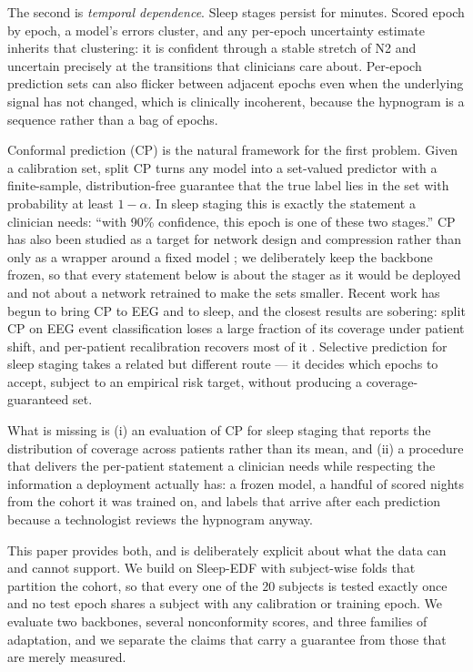 The second is \emph{temporal dependence}. Sleep stages persist for minutes.
Scored epoch by epoch, a model's errors cluster, and any per-epoch
uncertainty estimate inherits that clustering: it is confident through a
stable stretch of N2 and uncertain precisely at the transitions that
clinicians care about. Per-epoch prediction sets can also flicker between
adjacent epochs even when the underlying signal has not changed, which is
clinically incoherent, because the hypnogram is a sequence rather than a bag
of epochs.

Conformal prediction (CP) \citep{vovk2005,angelopoulos2023gentle} is the
natural framework for the first problem. Given a calibration set, split CP
turns any model into a set-valued predictor with a finite-sample,
distribution-free guarantee that the true label lies in the set with
probability at least $1-\alpha$. In sleep staging this is exactly the
statement a clinician needs: ``with 90\% confidence, this epoch is one of
these two stages.'' CP has also been studied as a target for network
design and compression rather than only as a wrapper around a fixed model
\citep{zhao2025pruning}; we deliberately keep the backbone frozen, so that
every statement below is about the stager as it would be deployed and not
about a network retrained to make the sets smaller. Recent work has begun to
bring CP to EEG and to
sleep, and the closest results are sobering: split CP on EEG event
classification loses a large fraction of its coverage under patient shift,
and per-patient recalibration recovers most of it \citep{chatterjee2026}. Selective
prediction for sleep staging \citep{cover2026} takes a related but different
route --- it decides which epochs to accept, subject to an empirical risk
target, without producing a coverage-guaranteed set.

What is missing is (i) an evaluation of CP for sleep staging that reports the
distribution of coverage across patients rather than its mean, and (ii) a
procedure that delivers the per-patient statement a clinician needs while
respecting the information a deployment actually has: a frozen model, a
handful of scored nights from the cohort it was trained on, and labels that
arrive after each prediction because a technologist reviews the hypnogram
anyway.

This paper provides both, and is deliberately explicit about what the data
can and cannot support. We build on Sleep-EDF
\citep{kemp2000,goldberger2000} with subject-wise folds that partition the
cohort, so that every one of the 20 subjects is tested exactly once
and no test epoch shares a subject with any calibration or training epoch. We
evaluate two backbones, several nonconformity scores, and three families of
adaptation, and we separate the claims that carry a guarantee from those that
are merely measured.

